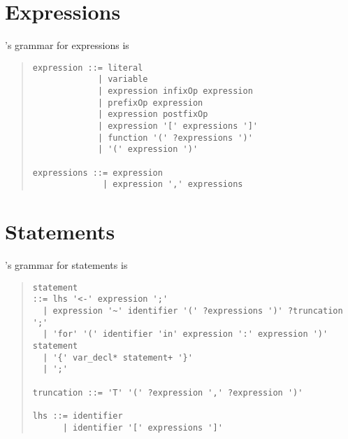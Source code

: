 \section{Expressions}

\Stan's grammar for expressions is 
%
\begin{quote}
\begin{Verbatim}
expression ::= literal
             | variable
             | expression infixOp expression
             | prefixOp expression
             | expression postfixOp
             | expression '[' expressions ']'
             | function '(' ?expressions ')'
             | '(' expression ')'

expressions ::= expression
              | expression ',' expressions
\end{Verbatim}
\end{quote}

\section{Statements}

\Stan's grammar for statements is
%
\begin{quote}
\begin{Verbatim}
statement 
::= lhs '<-' expression ';'
  | expression '~' identifier '(' ?expressions ')' ?truncation ';'
  | 'for' '(' identifier 'in' expression ':' expression ')' statement
  | '{' var_decl* statement+ '}'
  | ';'

truncation ::= 'T' '(' ?expression ',' ?expression ')' 

lhs ::= identifier
      | identifier '[' expressions ']'

\end{Verbatim}
\end{quote}


